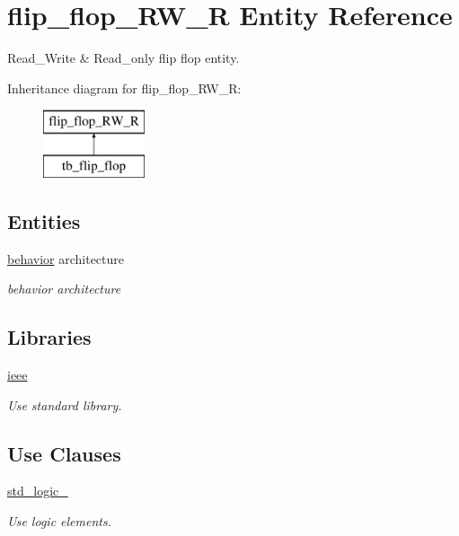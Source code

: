 \hypertarget{classflip__flop___r_w___r}{}\section{flip\+\_\+flop\+\_\+\+R\+W\+\_\+R Entity Reference}
\label{classflip__flop___r_w___r}


Read\+\_\+\+Write \& Read\+\_\+only flip flop entity.  


Inheritance diagram for flip\+\_\+flop\+\_\+\+R\+W\+\_\+R\+:\begin{figure}[H]
\begin{center}
\leavevmode
\includegraphics[height=2.000000cm]{classflip__flop___r_w___r}
\end{center}
\end{figure}
\subsection*{Entities}
\begin{DoxyCompactItemize}
\item 
\hyperlink{classflip__flop___r_w___r_1_1behavior}{behavior} architecture
\begin{DoxyCompactList}\small\item\em behavior architecture \end{DoxyCompactList}\end{DoxyCompactItemize}
\subsection*{Libraries}
 \begin{DoxyCompactItemize}
\item 
\hyperlink{classflip__flop___r_w___r_a0a6af6eef40212dbaf130d57ce711256}{ieee} 
\begin{DoxyCompactList}\small\item\em Use standard library. \end{DoxyCompactList}\end{DoxyCompactItemize}
\subsection*{Use Clauses}
 \begin{DoxyCompactItemize}
\item 
\hyperlink{classflip__flop___r_w___r_acd03516902501cd1c7296a98e22c6fcb}{std\+\_\+logic\+\_}   
\begin{DoxyCompactList}\small\item\em Use logic elements. \end{DoxyCompactList}\end{DoxyCompactItemize}
